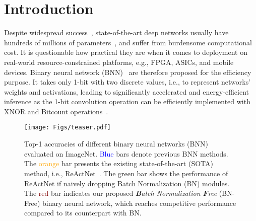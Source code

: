 \documentclass[final]{cvpr}
\begin{document}
\section{Introduction}
Despite widespread success~\cite{szegedy2015going,he2016deep,ren2015faster,redmon2016you,long2015fully,chen2017rethinking,pan2016shallow}, state-of-the-art deep networks usually have hundreds of millions of parameters~\cite{brock2021agc,jia2021scaling,pham2020meta}, and suffer from burdensome computational cost. It is questionable how practical they are when it comes to deployment on real-world resource-constrained platforms, e.g., FPGA, ASICs, and mobile devices. Binary neural network (BNN)~\cite{courbariaux2016binarized,courbariaux2015binaryconnect,qin2020binary,rastegari2016xnor,zhou2016dorefa} are therefore proposed for the efficiency purpose. It takes only 1-bit with two discrete values, i.e.,  to represent networks' weights and activations, leading to significantly accelerated and energy-efficient inference as the 1-bit convolution operation can be efficiently implemented with XNOR and Bitcount operations~\cite{rastegari2016xnor}. 

\begin{figure}[tb]
    \centering
    \texttt{[image: Figs/teaser.pdf]}
    \caption{Top-1 accuracies of different binary neural networks (BNN) evaluated on ImageNet. \textcolor{blue}{Blue} bars denote previous BNN methods. The \textcolor{orange}{orange} bar presents the existing state-of-the-art (SOTA) method, i.e., ReActNet~\cite{liu2020reactnet}. The \textcolor{OliveGreen}{green} bar shows the performance of ReActNet if naively dropping Batch Normalization (BN) modules. The \textcolor{Maroon}{red} bar indicates our proposed \textit{\textbf{B}atch Normalization \textbf{F}ree} (BN-Free) binary neural network, which reaches competitive performance compared to its counterpart with BN.}
    \label{fig:teaser}
\end{figure}
\end{document}
